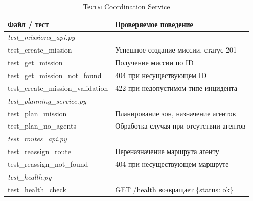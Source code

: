 \documentclass[12pt,a4paper]{article}
\begin{document}
\begin{table}[H]
\centering
\caption{Тесты Coordination Service}
\begin{tabularx}{\textwidth}{|l|X|}
\hline
\textbf{Файл / тест} & \textbf{Проверяемое поведение} \\
\hline
\multicolumn{2}{|l|}{\textit{test\_missions\_api.py}} \\
\hline
test\_create\_mission       & Успешное создание миссии, статус 201 \\
test\_get\_mission          & Получение миссии по ID \\
test\_get\_mission\_not\_found & 404 при несуществующем ID \\
test\_create\_mission\_validation & 422 при недопустимом типе инцидента \\
\hline
\multicolumn{2}{|l|}{\textit{test\_planning\_service.py}} \\
\hline
test\_plan\_mission         & Планирование зон, назначение агентов \\
test\_plan\_no\_agents      & Обработка случая при отсутствии агентов \\
\hline
\multicolumn{2}{|l|}{\textit{test\_routes\_api.py}} \\
\hline
test\_reassign\_route       & Переназначение маршрута агенту \\
test\_reassign\_not\_found  & 404 при несуществующем маршруте \\
\hline
\multicolumn{2}{|l|}{\textit{test\_health.py}} \\
\hline
test\_health\_check         & GET /health возвращает \{status: ok\} \\
\hline
\end{tabularx}
\end{table}
\end{document}

